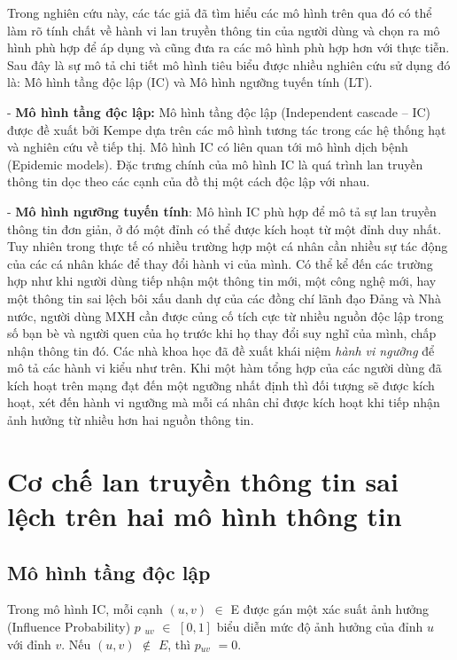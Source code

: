 Trong nghiên cứu này, các tác giả đã tìm hiểu các mô hình trên qua đó có thể làm rõ tính chất về hành vi lan truyền thông tin của người dùng và chọn ra mô hình phù hợp để áp dụng và cũng đưa ra các mô hình phù hợp hơn với thực tiễn. Sau đây là sự mô tả chi tiết mô hình tiêu biểu được nhiều nghiên cứu sử dụng đó là: Mô hình tầng độc lập (IC) và Mô hình ngưỡng tuyến tính (LT).

- {\bfseries Mô hình tầng độc lập:} Mô hình tầng độc lập (Independent cascade – IC) được đề xuất bởi Kempe \cite{kemple1} dựa trên các mô hình tương tác trong các hệ thống hạt và nghiên cứu về tiếp thị. Mô hình IC có liên quan tới mô hình dịch bệnh (Epidemic models). Đặc trưng chính của mô hình IC là quá trình lan truyền thông tin dọc theo các cạnh của đồ thị một cách độc lập với nhau.
	
- {\bfseries Mô hình ngưỡng tuyến tính}: Mô hình IC phù hợp để mô tả sự lan truyền thông tin đơn giản, ở đó một đỉnh có thể được kích hoạt từ một đỉnh duy nhất. Tuy nhiên trong thực tế có nhiều trường hợp một cá nhân cần nhiều sự tác động của các cá nhân khác để thay đổi hành vi của mình. Có thể kể đến các trường hợp như khi người dùng tiếp nhận một thông tin mới, một công nghệ mới, hay một thông tin sai lệch bôi xấu danh dự của các đồng chí lãnh đạo Đảng và Nhà nước, người dùng MXH cần được củng cố tích cực từ nhiều nguồn độc lập trong số bạn bè và người quen của họ trước khi họ thay đổi suy nghĩ của mình, chấp nhận thông tin đó. Các nhà khoa học đã đề xuất khái niệm {\itshape hành vi ngưỡng} để mô tả các hành vi kiểu như trên. Khi một hàm tổng hợp của các người dùng đã kích hoạt trên mạng đạt đến một ngưỡng nhất định thì đối tượng sẽ được kích hoạt, xét đến hành vi ngưỡng mà mỗi cá nhân chỉ được kích hoạt khi tiếp nhận ảnh hưởng từ nhiều hơn hai nguồn thông tin.

\section{Cơ chế lan truyền thông tin sai lệch trên hai mô hình thông tin}
	\subsection{Mô hình tầng độc lập} 
	Trong mô hình IC, mỗi cạnh $(u,v)$ $\in$ E được gán một xác suất ảnh hưởng (Influence Probability) $p$ $_{uv}$ $\in$ $[0,1]$ biểu diễn mức độ ảnh hưởng của đỉnh $u$ với đỉnh $v$. Nếu $(u,v)$ $\notin$ $E$, thì $p$$_{uv}$ $= 0$.
	
